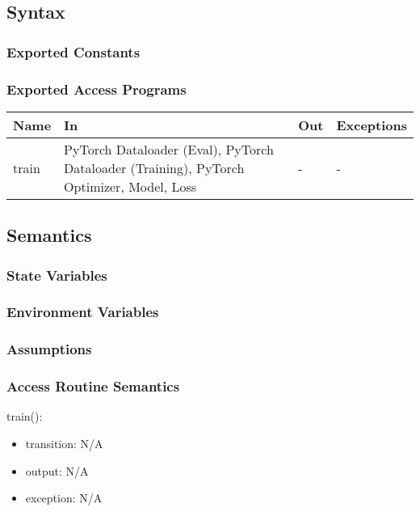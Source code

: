 \documentclass[12pt, titlepage]{article}
\begin{document}
\subsection{Syntax}



\subsubsection{Exported Constants}



\subsubsection{Exported Access Programs}

\begin{center}
\begin{tabular}{p{2cm}|p{6cm}|p{2cm}|p{2cm}}
\hline
\textbf{Name} & \textbf{In} & \textbf{Out} & \textbf{Exceptions} \\
\hline
train & PyTorch Dataloader (Eval), PyTorch Dataloader (Training), PyTorch Optimizer, Model, Loss& - & - \\
\hline
\end{tabular}
\end{center}

\subsection{Semantics}

\subsubsection{State Variables}


\subsubsection{Environment Variables}


\subsubsection{Assumptions}


\subsubsection{Access Routine Semantics}


\noindent train():
\begin{itemize}
\item transition: N/A 
\item output: N/A
\item exception: N/A
\end{itemize}
\end{document}
